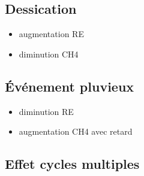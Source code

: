 \subsection{Dessication}



\begin{itemize}
\item augmentation RE
\item diminution CH4
\end{itemize}

\subsection{Événement pluvieux}

\begin{itemize}
\item diminution RE
\item augmentation CH4 avec retard
\end{itemize}

\subsection{Effet cycles multiples}


